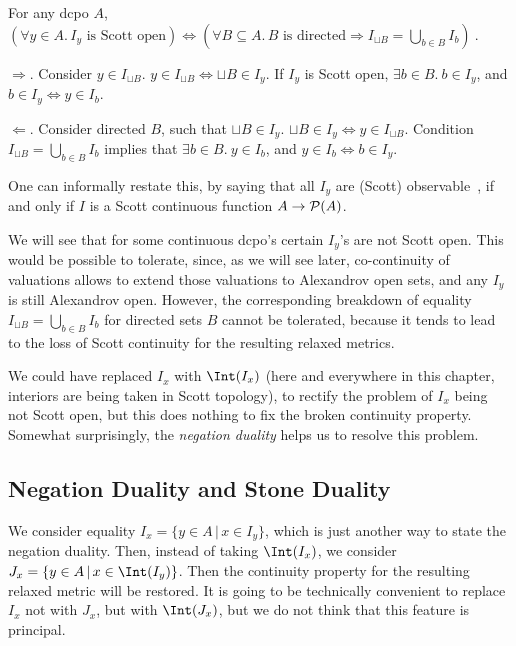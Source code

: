 \begin{Lemma} For any dcpo $A$, 
$(\forall y \in A.\, I_y \mbox{ is Scott open})
\Leftrightarrow 
(\forall B \subseteq A.\,
B \mbox{ is directed} \Rightarrow 
I_{\sqcup B} = \bigcup_{b \in B} I_b)\ .$
\end{Lemma}

\Proof
$\Rightarrow$. Consider $y \in I_{\sqcup B}$. 
$y \in I_{\sqcup B} \Leftrightarrow \sqcup B \in I_y$.
If $I_y$ is Scott open, $\exists b \in B.\ b \in I_y$,
and $b \in I_y \Leftrightarrow y \in I_b$.

$\Leftarrow$. Consider directed $B$, such that $\sqcup B \in I_y$.
$\sqcup B \in I_y \Leftrightarrow y \in I_{\sqcup B}$.
Condition $I_{\sqcup B} = \bigcup_{b \in B} I_b$ implies
that $\exists b \in B.\ y \in I_b$, and
$y \in I_b \Leftrightarrow b \in I_y$.
\eproof

One can informally restate this, by saying that all $I_y$ are
(Scott) observable~\cite{Smyth}, if and only if $I$ is a Scott
continuous function $A \rightarrow {\cal P}(A)$.

We will see that for some continuous dcpo's certain $I_y$'s are not
Scott open. This would be possible to tolerate, since, as we will see
later, co-continuity of valuations allows to extend those valuations to
Alexandrov open sets, and any $I_y$ is still Alexandrov open.
However, the corresponding breakdown of equality
$I_{\sqcup B} = \bigcup_{b \in B} I_b$ for directed sets $B$
cannot be tolerated, because it tends to lead to the loss of
Scott continuity for the resulting relaxed metrics.

We could have replaced $I_x$ with $\Int(I_x)$ (here and everywhere
in this chapter, interiors are being taken in Scott topology),
to rectify the problem of $I_x$ being not Scott open, but this
does nothing to fix the broken continuity property.
Somewhat surprisingly, the {\em negation duality} helps us to
resolve this problem. 

\subsection{Negation Duality and Stone Duality}

We consider equality $I_x = \{y \in A\,
|\,x \in I_y\}$, which is just another way to state the
negation duality. Then, instead of taking $\Int(I_x)$,
we consider $J_x = \{y \in A\,|\, x \in \Int(I_y)\}$.
Then the continuity property for the
resulting relaxed metric will be restored.
It is going to be technically convenient to replace $I_x$
not with $J_x$, but with $\Int(J_x)$, but we do not think that this
feature is principal.

